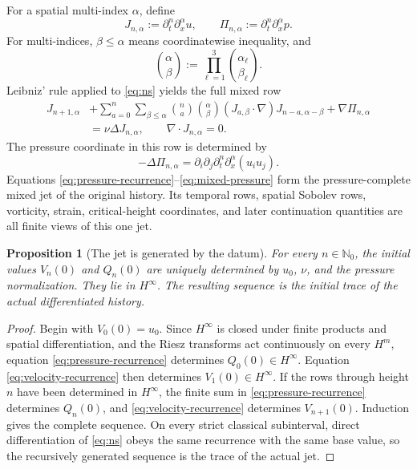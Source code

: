 \documentclass[11pt,letterpaper]{article}
\newtheorem{proposition}[theorem]{Proposition}
\theoremstyle{definition}
\theoremstyle{remark}
\newcommand{\Nzero}{\mathbb N_0}
\begin{document}
For a spatial multi-index \(\alpha\), define
\[
J_{n,\alpha}:=\partial_t^n\partial_x^\alpha u,
\qquad
\Pi_{n,\alpha}:=\partial_t^n\partial_x^\alpha p.
\]
For multi-indices, \(\beta\le\alpha\) means coordinatewise inequality, and
\[
\binom{\alpha}{\beta}
:=\prod_{\ell=1}^{3}\binom{\alpha_\ell}{\beta_\ell}.
\]
Leibniz' rule applied to \eqref{eq:ns} yields the full mixed row
\begin{equation}
\begin{aligned}
J_{n+1,\alpha}
&+\sum_{a=0}^{n}\sum_{\beta\le\alpha}
  \binom{n}{a}\binom{\alpha}{\beta}
  (J_{a,\beta}\cdot\nabla)J_{n-a,\alpha-\beta}
  +\nabla\Pi_{n,\alpha} \\
&=\nu\Delta J_{n,\alpha},
\qquad
\nabla\cdot J_{n,\alpha}=0.
\end{aligned}
\label{eq:mixed-recurrence}
\end{equation}
The pressure coordinate in this row is determined by
\begin{equation}
-\Delta\Pi_{n,\alpha}
=\partial_i\partial_j\partial_t^n\partial_x^\alpha(u_i u_j).
\label{eq:mixed-pressure}
\end{equation}
Equations \eqref{eq:pressure-recurrence}--\eqref{eq:mixed-pressure} form the
pressure-complete mixed jet of the original history.  Its temporal rows,
spatial Sobolev rows, vorticity, strain, critical-height coordinates, and
later continuation quantities are all finite views of this one jet.

\begin{proposition}[The jet is generated by the datum]
\label{prop:datum-jet}
For every \(n\in\Nzero\), the initial values \(V_n(0)\) and \(Q_n(0)\) are
uniquely determined by \(u_0\), \(\nu\), and the pressure normalization.
They lie in \(H^\infty\).  The resulting sequence is the initial trace of
the actual differentiated history.
\end{proposition}

\begin{proof}
Begin with \(V_0(0)=u_0\).  Since \(H^\infty\) is closed under finite
products and spatial differentiation, and the Riesz transforms act
continuously on every \(H^m\), equation
\eqref{eq:pressure-recurrence} determines \(Q_0(0)\in H^\infty\).
Equation \eqref{eq:velocity-recurrence} then determines
\(V_1(0)\in H^\infty\).  If the rows through height \(n\) have been
determined in \(H^\infty\), the finite sum in
\eqref{eq:pressure-recurrence} determines \(Q_n(0)\), and
\eqref{eq:velocity-recurrence} determines \(V_{n+1}(0)\).
Induction gives the complete sequence.  On every strict classical
subinterval, direct differentiation of \eqref{eq:ns} obeys the same
recurrence with the same base value, so the recursively generated sequence
is the trace of the actual jet.
\end{proof}
\end{document}
